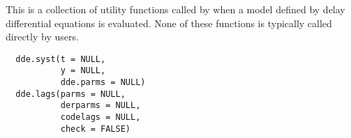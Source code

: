 %
\begin{Description}\relax
This is a collection of utility functions called by  when 
a model defined by delay differential equations is evaluated. None of these 
functions is typically called directly by users.
\end{Description}
%
\begin{Usage}
\begin{verbatim}
  dde.syst(t = NULL,
           y = NULL,
           dde.parms = NULL)
  dde.lags(parms = NULL,
           derparms = NULL,
           codelags = NULL,
           check = FALSE)
\end{verbatim}
\end{Usage}
%
